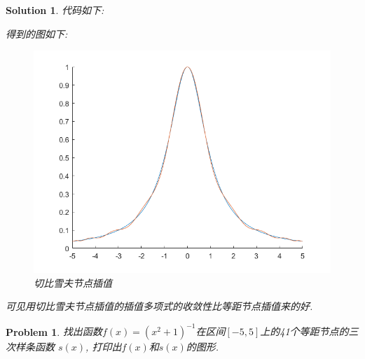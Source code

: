 \documentclass[a4paper, 12pt]{ctexart}
\let\oldlstinputlisting
\renewcommand{}[2][\empty]{
    \par\nolinenumbers\oldlstinputlisting[#1]{#2}\linenumbers\par
}
\theoremstyle{plain}
\newtheorem{problem}{Problem}[section]
\theoremstyle{plain}
\theoremstyle{plain}
\theoremstyle{nonumberplain}
\newtheorem{solution}{Solution}
\begin{document}
    \begin{solution}
        代码如下:
        

        得到的图如下:
        \begin{figure}[H]
            \centering
            \includegraphics[scale=0.5]{3_4.png}
            \caption{切比雪夫节点插值}
        \end{figure}

        可见用切比雪夫节点插值的插值多项式的收敛性比等距节点插值来的好.
    \end{solution}
    \clearpage

    \begin{problem}
        找出函数$f(x)=(x^{2}+1)^{-1}$在区间$[-5, 5]$上的41个等距节点的三次样条函数
        $s(x)$, 打印出$f(x)$和$s(x)$的图形.
    \end{problem}
\end{document}
